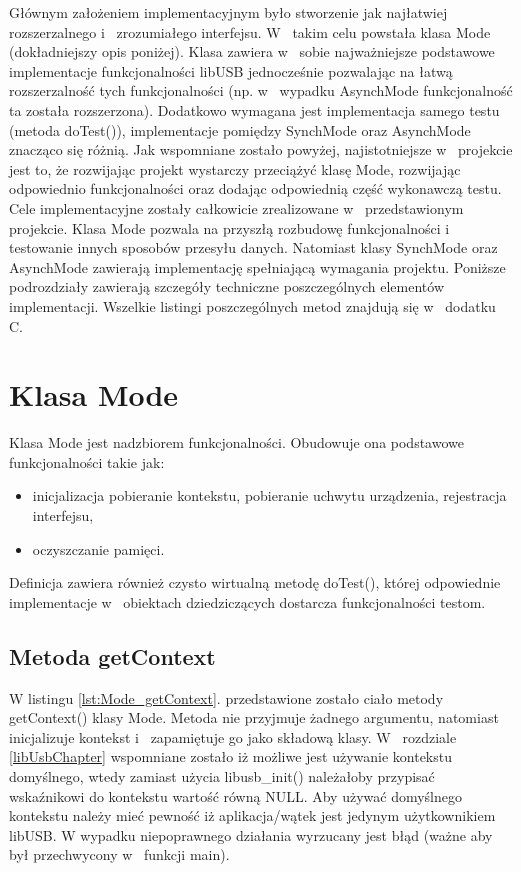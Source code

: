 \documentclass{BscUS}
\begin{document}
Głównym założeniem implementacyjnym było stworzenie jak najłatwiej rozszerzalnego i~ zrozumiałego interfejsu. W~ takim celu powstała klasa Mode (dokładniejszy opis poniżej). Klasa zawiera w~ sobie najważniejsze podstawowe implementacje funkcjonalności libUSB jednocześnie pozwalając na łatwą rozszerzalność tych funkcjonalności (np. w~ wypadku AsynchMode funkcjonalność ta została rozszerzona). Dodatkowo wymagana jest implementacja samego testu (metoda doTest()), implementacje pomiędzy SynchMode oraz AsynchMode znacząco się różnią. Jak wspomniane zostało powyżej, najistotniejsze w~ projekcie jest to, że rozwijając projekt wystarczy przeciążyć klasę Mode, rozwijając odpowiednio funkcjonalności oraz dodając odpowiednią część wykonawczą testu.
\newline
\indent Cele implementacyjne zostały całkowicie zrealizowane w~ przedstawionym projekcie. Klasa Mode pozwala na przyszłą rozbudowę funkcjonalności i~ testowanie innych sposobów przesyłu danych. Natomiast klasy SynchMode oraz AsynchMode zawierają implementację spełniającą wymagania projektu. Poniższe podrozdziały zawierają szczegóły techniczne poszczególnych elementów implementacji. Wszelkie listingi poszczególnych metod znajdują się w~ dodatku C.
\section{Klasa Mode}
Klasa Mode jest nadzbiorem funkcjonalności. Obudowuje ona podstawowe funkcjonalności takie jak:
\begin{itemize}
\item inicjalizacja
\subitem pobieranie kontekstu,
\subitem pobieranie uchwytu urządzenia,
\subitem rejestracja interfejsu,
\item oczyszczanie pamięci.
\end{itemize}
Definicja zawiera również czysto wirtualną metodę doTest(), której odpowiednie implementacje w~ obiektach dziedziczących dostarcza funkcjonalności testom.

\subsection{Metoda getContext}
W listingu \ref{lst:Mode_getContext}. przedstawione zostało ciało metody getContext() klasy Mode.
Metoda nie przyjmuje żadnego argumentu, natomiast inicjalizuje kontekst i~ zapamiętuje go jako składową klasy. W~ rozdziale \ref{libUsbChapter} wspomniane zostało iż możliwe jest używanie kontekstu domyślnego, wtedy zamiast użycia libusb\_init() należałoby przypisać wskaźnikowi do kontekstu wartość równą NULL. 
Aby używać domyślnego kontekstu należy mieć pewność iż aplikacja/wątek jest jedynym użytkownikiem libUSB.
W wypadku niepoprawnego działania wyrzucany jest błąd (ważne aby był przechwycony w~ funkcji main).
\end{document}
